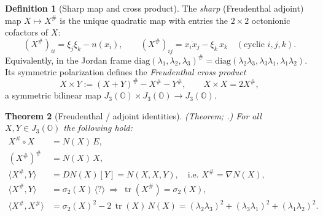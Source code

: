\documentclass[11pt]{article}
\theoremstyle{plain}
\newtheorem{theorem}{Theorem}[section]
\theoremstyle{definition}
\newtheorem{definition}[theorem]{Definition}
\theoremstyle{remark}
\begin{document}
\begin{definition}[Sharp map and cross product]\label{def:app-albert:sharp}
The \emph{sharp} (Freudenthal adjoint) map $X\mapsto X^\#$ is the unique quadratic
map with entries the $2\times2$ octonionic cofactors of $X$:
\begin{equation}\label{eq:app-albert:sharpentries}
  (X^\#)_{ii}=\xi_j\xi_k-n(x_i),
  \qquad
  (X^\#)_{ij}=\overline{x_i x_j}-\xi_k\,x_k
  \quad(\text{cyclic } i,j,k).
\end{equation}
Equivalently, in the Jordan frame
$\mathrm{diag}(\lambda_1,\lambda_2,\lambda_3)^\#
 =\mathrm{diag}(\lambda_2\lambda_3,\lambda_3\lambda_1,\lambda_1\lambda_2)$. Its
symmetric polarization defines the \emph{Freudenthal cross product}
\begin{equation}\label{eq:app-albert:cross}
  X\times Y:=(X+Y)^\#-X^\#-Y^\#,
  \qquad X\times X=2X^\#,
\end{equation}
a symmetric bilinear map $J_3(\mathbb O)\times J_3(\mathbb O)\to J_3(\mathbb O)$.
\end{definition}

\begin{theorem}[Freudenthal / adjoint identities]\label{thm:app-albert:freudenthal}
\textup{(Theorem; \cite{Freudenthal:1985,McCrimmon:2004,Springer:2000}.)}
For all $X,Y\in J_3(\mathbb O)$ the following hold:
\begin{align}
  X^\#\circ X &= N(X)\,E,
  \label{eq:app-albert:F1}\\
  (X^\#)^\# &= N(X)\,X,
  \label{eq:app-albert:F2}\\
  \langle X^\#,Y\rangle &= DN(X)[Y]
     = N(X,X,Y),
  \quad\text{i.e. } X^\#=\nabla N(X),
  \label{eq:app-albert:F3}\\
  \langle X^\#,Y\rangle &= \sigma_2(X)\,\langle?\rangle
     \ \Longrightarrow\
  \operatorname{tr}(X^\#)=\sigma_2(X),
  \label{eq:app-albert:F4}\\
  \langle X^\#,X^\#\rangle
     &= \sigma_2(X)^2-2\,\operatorname{tr}(X)\,N(X)
     = (\lambda_2\lambda_3)^2+(\lambda_3\lambda_1)^2+(\lambda_1\lambda_2)^2.
  \label{eq:app-albert:F5}
\end{align}
\end{theorem}
\end{document}
